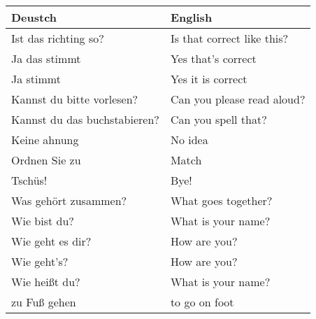 \documentclass{article}
\renewcommand{\arraystretch}{1}
\begin{document}
\begin{minipage}{0.48\textwidth}
    \centering
    \renewcommand{\arraystretch}{1.5}
    \begin{tabular}{|>{\raggedright\arraybackslash}p{3.5cm}|>{\raggedright\arraybackslash}p{3.5cm}|}
        \hline
        \rowcolor{gray!20} \textbf{Deustch} & \textbf{English} \\
        \hline
        Ist das richting so? & Is that correct like this? \\\hline
        Ja das stimmt & Yes that's correct \\\hline
        Ja stimmt &  Yes it is correct \\\hline
        Kannst du bitte vorlesen? &  Can you please read aloud? \\\hline
        Kannst du das buchstabieren? & Can you spell that? \\\hline
        Keine ahnung & No idea \\\hline
        Ordnen Sie zu & Match \\\hline
        Tschüs! & Bye! \\\hline
        Was gehört zusammen? & What goes together? \\\hline
        Wie bist du? & What is your name? \\\hline
        Wie geht es dir? &  How are you? \\\hline
        Wie geht's? &  How are you? \\\hline
        Wie hei\ss{}t du? & What is your name? \\\hline
        zu Fu\ss{} gehen & to go on foot \\\hline
    \end{tabular}
\end{minipage}
\end{document}
